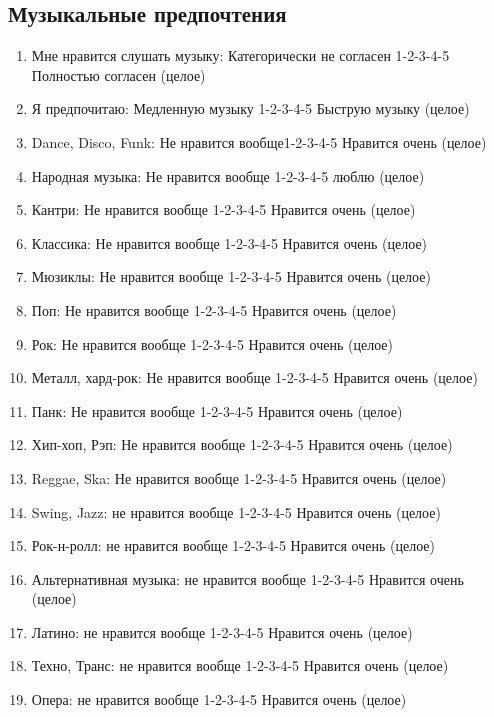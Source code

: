 \documentclass[11pt]{article}
\begin{document}
\subsection{Музыкальные предпочтения}
\begin{enumerate}
\item Мне нравится слушать музыку: Категорически не согласен 1-2-3-4-5 Полностью согласен (целое)
\item Я предпочитаю: Медленную музыку 1-2-3-4-5 Быструю музыку (целое)
\item Dance, Disco, Funk: Не нравится вообще1-2-3-4-5 Нравится очень (целое)
\item Народная музыка: Не нравится вообще 1-2-3-4-5 люблю (целое)
\item Кантри: Не нравится вообще 1-2-3-4-5 Нравится очень (целое)
\item Классика: Не нравится вообще 1-2-3-4-5 Нравится очень (целое)
\item Мюзиклы: Не нравится вообще 1-2-3-4-5 Нравится очень (целое)
\item Поп: Не нравится вообще 1-2-3-4-5 Нравится очень (целое)
\item Рок: Не нравится вообще 1-2-3-4-5 Нравится очень (целое)
\item Металл, хард-рок: Не нравится вообще 1-2-3-4-5 Нравится очень (целое)
\item Панк: Не нравится вообще  1-2-3-4-5 Нравится очень (целое)
\item Хип-хоп, Рэп: Не нравится вообще 1-2-3-4-5 Нравится очень (целое)
\item Reggae, Ska: Не нравится вообще 1-2-3-4-5 Нравится очень (целое)
\item Swing, Jazz: не нравится вообще 1-2-3-4-5 Нравится очень (целое)
\item Рок-н-ролл: не нравится вообще 1-2-3-4-5 Нравится очень (целое)
\item Альтернативная музыка: не нравится вообще 1-2-3-4-5 Нравится очень (целое)
\item Латино: не нравится вообще 1-2-3-4-5 Нравится очень (целое)
\item Техно, Транс: не нравится вообще  1-2-3-4-5 Нравится очень (целое)
\item Опера: не нравится вообще  1-2-3-4-5 Нравится очень (целое)
\end{enumerate}
\end{document}
